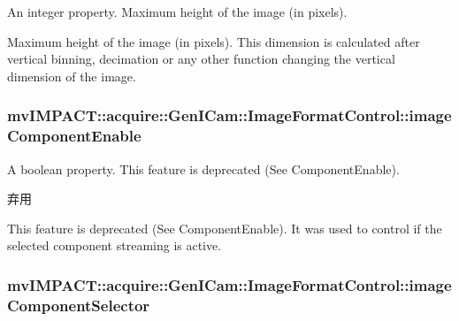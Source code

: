 An integer property. Maximum height of the image (in pixels). 

Maximum height of the image (in pixels). This dimension is calculated after vertical binning, decimation or any other function changing the vertical dimension of the image. \hypertarget{classmv_i_m_p_a_c_t_1_1acquire_1_1_gen_i_cam_1_1_image_format_control_abb89d1bfa99e26551bb92e842195d2f8}{
\subsubsection[{image\+Component\+Enable}]{ mv\+I\+M\+P\+A\+C\+T\+::acquire\+::\+Gen\+I\+Cam\+::\+Image\+Format\+Control\+::image\+Component\+Enable}}\label{classmv_i_m_p_a_c_t_1_1acquire_1_1_gen_i_cam_1_1_image_format_control_abb89d1bfa99e26551bb92e842195d2f8}


A boolean property. This feature is deprecated (See Component\+Enable). 

\begin{DoxyRefDesc}{弃用}
\item[\hyperlink{deprecated__deprecated000040}{弃用}]This feature is deprecated (See Component\+Enable). It was used to control if the selected component streaming is active. \end{DoxyRefDesc}
\hypertarget{classmv_i_m_p_a_c_t_1_1acquire_1_1_gen_i_cam_1_1_image_format_control_a9ca6d7404e0a91dffc11e1ac777f2d23}{
\subsubsection[{image\+Component\+Selector}]{ mv\+I\+M\+P\+A\+C\+T\+::acquire\+::\+Gen\+I\+Cam\+::\+Image\+Format\+Control\+::image\+Component\+Selector}}\label{classmv_i_m_p_a_c_t_1_1acquire_1_1_gen_i_cam_1_1_image_format_control_a9ca6d7404e0a91dffc11e1ac777f2d23}


